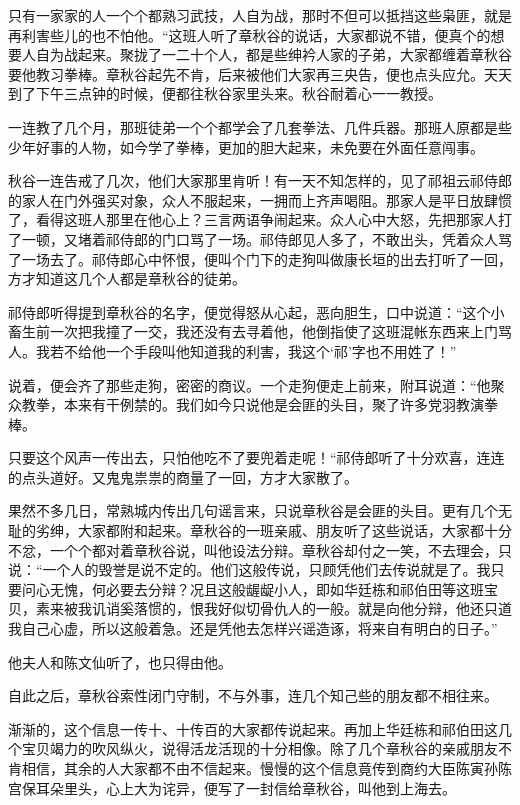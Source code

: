 \documentclass[12pt,UTF8]{ctexbook}
\begin{document}
{{{只有一家家的人一个个都熟习武技，人自为战，那时不但可以抵挡这些枭匪，就是再利害些儿的也不怕他。“这班人听了章秋谷的说话，大家都说不错，便真个的想要人自为战起来。聚拢了一二十个人，都是些绅衿人家的子弟，大家都缠着章秋谷要他教习拳棒。章秋谷起先不肯，后来被他们大家再三央告，便也点头应允。天天到了下午三点钟的时候，便都往秋谷家里头来。秋谷耐着心一一教授。

一连教了几个月，那班徒弟一个个都学会了几套拳法、几件兵器。那班人原都是些少年好事的人物，如今学了拳棒，更加的胆大起来，未免要在外面任意闯事。

秋谷一连告戒了几次，他们大家那里肯听！有一天不知怎样的，见了祁祖云祁侍郎的家人在门外强买对象，众人不服起来，一拥而上齐声喝阻。那家人是平日放肆惯了，看得这班人那里在他心上？三言两语争闹起来。众人心中大怒，先把那家人打了一顿，又堵着祁侍郎的门口骂了一场。祁侍郎见人多了，不敢出头，凭着众人骂了一场去了。祁侍郎心中怀恨，便叫个门下的走狗叫做康长垣的出去打听了一回，方才知道这几个人都是章秋谷的徒弟。

祁侍郎听得提到章秋谷的名字，便觉得怒从心起，恶向胆生，口中说道：“这个小畜生前一次把我撞了一交，我还没有去寻着他，他倒指使了这班混帐东西来上门骂人。我若不给他一个手段叫他知道我的利害，我这个‘祁’字也不用姓了！”

说着，便会齐了那些走狗，密密的商议。一个走狗便走上前来，附耳说道：“他聚众教拳，本来有干例禁的。我们如今只说他是会匪的头目，聚了许多党羽教演拳棒。

只要这个风声一传出去，只怕他吃不了要兜着走呢！“祁侍郎听了十分欢喜，连连的点头道好。又鬼鬼祟祟的商量了一回，方才大家散了。

果然不多几日，常熟城内传出几句谣言来，只说章秋谷是会匪的头目。更有几个无耻的劣绅，大家都附和起来。章秋谷的一班亲戚、朋友听了这些说话，大家都十分不忿，一个个都对着章秋谷说，叫他设法分辩。章秋谷却付之一笑，不去理会，只说：“一个人的毁誉是说不定的。他们这般传说，只顾凭他们去传说就是了。我只要问心无愧，何必要去分辩？况且这般龌龊小人，即如华廷栋和祁伯田等这班宝贝，素来被我讥诮奚落惯的，恨我好似切骨仇人的一般。就是向他分辩，他还只道我自己心虚，所以这般着急。还是凭他去怎样兴谣造诼，将来自有明白的日子。”

他夫人和陈文仙听了，也只得由他。

自此之后，章秋谷索性闭门守制，不与外事，连几个知己些的朋友都不相往来。

渐渐的，这个信息一传十、十传百的大家都传说起来。再加上华廷栋和祁伯田这几个宝贝竭力的吹风纵火，说得活龙活现的十分相像。除了几个章秋谷的亲戚朋友不肯相信，其余的人大家都不由不信起来。慢慢的这个信息竟传到商约大臣陈寅孙陈宫保耳朵里头，心上大为诧异，便写了一封信给章秋谷，叫他到上海去。

}}}
\end{document}
